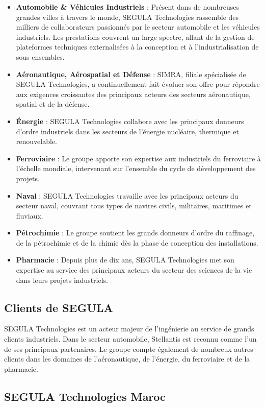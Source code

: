 \begin{itemize}
    \item \textbf{Automobile \& Véhicules Industriels} : Présent dans de nombreuses grandes villes à travers le monde, SEGULA Technologies rassemble des milliers de collaborateurs passionnés par le secteur automobile et les véhicules industriels. Les prestations couvrent un large spectre, allant de la gestion de plateformes techniques externalisées à la conception et à l'industrialisation de sous-ensembles.
    \item \textbf{Aéronautique, Aérospatial et Défense} : SIMRA, filiale spécialisée de SEGULA Technologies, a continuellement fait évoluer son offre pour répondre aux exigences croissantes des principaux acteurs des secteurs aéronautique, spatial et de la défense.
    \item \textbf{Énergie} : SEGULA Technologies collabore avec les principaux donneurs d'ordre industriels dans les secteurs de l'énergie nucléaire, thermique et renouvelable.
    \item \textbf{Ferroviaire} : Le groupe apporte son expertise aux industriels du ferroviaire à l'échelle mondiale, intervenant sur l'ensemble du cycle de développement des projets.
    \item \textbf{Naval} : SEGULA Technologies travaille avec les principaux acteurs du secteur naval, couvrant tous types de navires civils, militaires, maritimes et fluviaux.
    \item \textbf{Pétrochimie} : Le groupe soutient les grands donneurs d'ordre du raffinage, de la pétrochimie et de la chimie dès la phase de conception des installations.
    \item \textbf{Pharmacie} : Depuis plus de dix ans, SEGULA Technologies met son expertise au service des principaux acteurs du secteur des sciences de la vie dans leurs projets industriels.
\end{itemize}

\subsection{Clients de SEGULA}
SEGULA Technologies est un acteur majeur de l'ingénierie au service de grands clients industriels. Dans le secteur automobile, Stellantis est reconnu comme l'un de ses principaux partenaires. Le groupe compte également de nombreux autres clients dans les domaines de l'aéronautique, de l'énergie, du ferroviaire et de la pharmacie.

\subsection{SEGULA Technologies Maroc}
